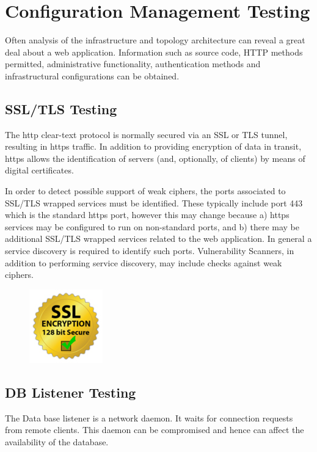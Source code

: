 \chapter{Configuration Management Testing}
	Often analysis of the infrastructure and topology architecture can reveal a great deal about a 
	web application. Information such as source code, HTTP methods permitted, administrative 
	functionality, authentication methods and infrastructural configurations can be obtained.

\clearpage
\section{SSL/TLS Testing}
	The http clear-text protocol is normally secured via an SSL or TLS tunnel, resulting in 
	https traffic. In addition to providing encryption of data in transit, https allows the 
	identification of servers (and, optionally, of clients) by means of digital certificates.

	In order to detect possible support of weak ciphers, the ports associated to SSL/TLS wrapped 
	services must be identified. These typically include port 443 which is the standard https port, 
	however this may change because a) https services may be configured to run on non-standard ports, 
	and b) there may be additional SSL/TLS wrapped services related to the web 
	application. In general a service discovery is required to identify such ports. Vulnerability 
	Scanners, in addition to performing service discovery, may include checks against weak ciphers.

	\begin{figure}[H]
		\centering
		\includegraphics{pics/ssl.jpg}
	\end{figure}

\section{DB Listener Testing}
	The Data base listener is a network daemon. It waits for connection requests from remote
	clients. This daemon can be compromised and hence can affect the availability of the database.

